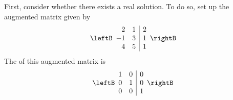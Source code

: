 \begin{solution}
First, consider whether there exists a real solution. To do so, set up the augmented matrix given by
\begin{equation*}
\leftB
\begin{array}{rr|r}
2 & 1 & 2 \\ 
-1 & 3 & 1 \\ 
4 & 5 & 1
\end{array}
\rightB
\end{equation*}
The {\rref} of this augmented matrix is 
\begin{equation*}
\leftB
\begin{array}{rr|r}
1 & 0 & 0 \\ 
0 & 1 & 0 \\ 
0 & 0 & 1
\end{array}
\rightB
\end{equation*}


\end{solution}
